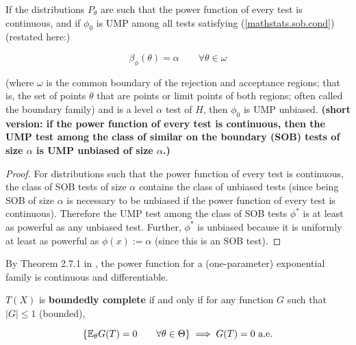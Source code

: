 \begin{lemma}\label{mathstats.lehman.rom.lem.4.1.1.ump.unbiased}

If the distributions \(P_\theta\) are such that the power function of every test is continuous, and if \(\phi_0\) is UMP among all tests satisfying (\ref{mathstats.sob.cond}) (restated here:)

\begin{equation}\label{mathstats.lehman.rom.lem.4.1.1.ump.unbiased.eqn}
\beta_\phi(\theta) = \alpha \qquad \forall \theta \in \omega
\end{equation}

(where \(\omega\) is the common boundary of the rejection and acceptance regions; that is, the set of points \(\theta\) that are points or limit points of both regions; often called the boundary family) and is a level \(\alpha\) test of \(H\), then \(\phi_0\) is UMP unbiased. \textbf{(short version: if the power function of every test is continuous, then the UMP test among the class of similar on the boundary (SOB) tests of size \(\alpha\) is UMP unbiased of size \(\alpha\).)}

\end{lemma}

\begin{proof}

For distributions such that the power function of every test is continuous, the class of SOB tests of size \(\alpha\) contains the class of unbiased tests (since being SOB of size \(\alpha\) is necessary to be unbiased if the power function of every test is continuous). Therefore the UMP test among the class of SOB tests \(\phi^*\) is at least as powerful as any unbiased test. Further, \(\phi^*\) is unbiased because it is uniformly at least as powerful as \(\phi(x) := \alpha\) (since this is an SOB test).

\end{proof}

\begin{remark}

By Theorem 2.7.1 in \citet{lehmann2005testing}, the power function for a (one-parameter) exponential family is continuous and differentiable.

\end{remark}

\begin{definition}

\(T(X)\) is \textbf{boundedly complete} if and only if for any function \(G\) such that \(|G| \leq 1\) (bounded), 

\[
 \left\{ \E_\theta G(T) = 0 \qquad \forall \theta \in \Theta \right\} \implies G(T) = 0 \text{ a.e.}
\] 

\end{definition}

